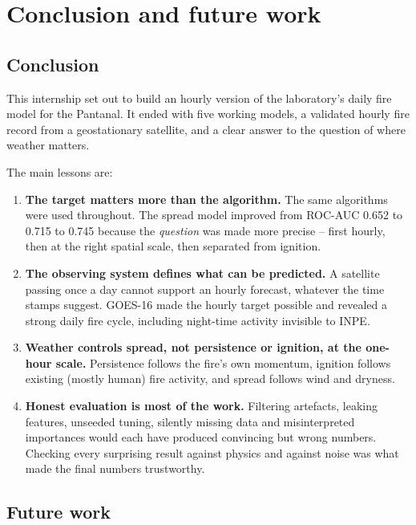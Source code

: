 \documentclass[11pt,a4paper,oneside]{report}
\begin{document}
\chapter{Conclusion and future work}\label{ch:conclusion}

\section{Conclusion}

This internship set out to build an hourly version of the laboratory's daily fire
model for the Pantanal. It ended with five working models, a validated hourly
fire record from a geostationary satellite, and a clear answer to the question of
where weather matters.

The main lessons are:
\begin{enumerate}
  \item \textbf{The target matters more than the algorithm.} The same algorithms
        were used throughout. The spread model improved from ROC-AUC 0.652 to
        0.715 to 0.745 because the \emph{question} was made more precise -- first
        hourly, then at the right spatial scale, then separated from ignition.
  \item \textbf{The observing system defines what can be predicted.} A satellite
        passing once a day cannot support an hourly forecast, whatever the time
        stamps suggest. GOES-16 made the hourly target possible and revealed a
        strong daily fire cycle, including night-time activity invisible to INPE.
  \item \textbf{Weather controls spread, not persistence or ignition, at the
        one-hour scale.} Persistence follows the fire's own momentum, ignition
        follows existing (mostly human) fire activity, and spread follows wind and
        dryness.
  \item \textbf{Honest evaluation is most of the work.} Filtering artefacts,
        leaking features, unseeded tuning, silently missing data and
        misinterpreted importances would each have produced convincing but wrong
        numbers. Checking every surprising result against physics and against
        noise was what made the final numbers trustworthy.
\end{enumerate}

\section{Future work}
\end{document}

